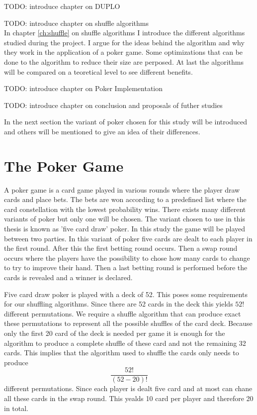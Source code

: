 \documentclass[twoside,11pt,openright]{report}
\newcommand{\todo}[1]{}
\renewcommand{\todo}[1]{{\color{red} TODO: {#1}} \\}
\begin{document}
\bigskip
\todo{introduce chapter on DUPLO}

\bigskip

\todo{introduce chapter on shuffle algorithms}
In chapter \ref{ch:shuffle} on shuffle algorithms I introduce the different algorithms studied during the project. I argue for the ideas behind the algorithm and why they work in the application of a poker game. Some optimizations that can be done to the algorithm to reduce their size are perposed. At last the algorithms will be compared on a teoretical level to see different benefits.

\bigskip

\todo{introduce chapter on Poker Implementation}

\bigskip

\todo{introduce chapter on conclusion and proposals of futher studies}

\bigskip

In the next section the variant of poker chosen for this study will be introduced and others will be mentioned to give an idea of their differences.

\section{The Poker Game}
\label{sec:poker}
A poker game is a card game played in various rounds where the player draw cards and place bets. The bets are won according to a predefined list where the card constellation with the lowest probability wins. There exists many different variants of poker but only one will be chosen. The variant chosen to use in this thesis is known as 'five card draw' poker. In this study the game will be played between two parties. In this variant of poker five cards are dealt to each player in the first round. After this the first betting round occurs. Then a swap round occurs where the players have the possibility to chose how many cards to change to try to improve their hand. Then a last betting round is performed before the cards is revealed and a winner is declared.

Five card draw poker is played with a deck of 52. This poses some requirements for our shuffling algorithms. Since there are 52 cards in the deck this yields $52!$ different permutations. We require a shuffle algorithm that can produce exact these permutations to represent all the possible shuffles of the card deck. Because only the first 20 card of the deck is needed per game it is enough for the algorithm to produce a complete shuffle of these card and not the remaining 32 cards. This implies that the algorithm used to shuffle the cards only needs to produce $$\frac{52!}{(52-20)!}$$ different permutations. Since each player is dealt five card and at most can chane all these cards in the swap round. This yealds 10 card per player and therefore 20 in total.
\end{document}
